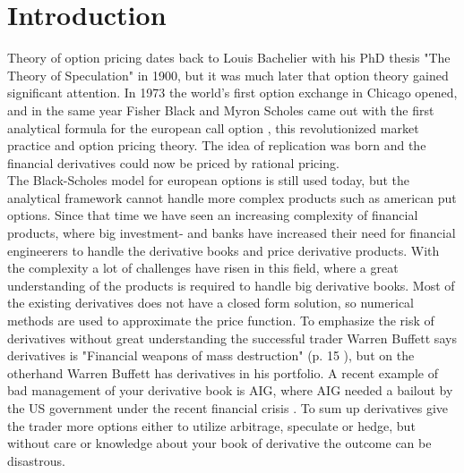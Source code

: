 
\chapter{Introduction} %

\label{Chapter1} %

Theory of option pricing dates back to Louis Bachelier with his PhD thesis "The Theory of Speculation" in 1900, but it was much later that option theory gained significant attention. In 1973 the world's first option exchange in Chicago opened, and in the same year Fisher Black and Myron Scholes came out with the first analytical formula for the european call option \parencite{B-S-Paper}, this revolutionized market practice and option pricing theory. The idea of replication was born and the financial derivatives could now be priced by rational pricing. \\

The Black-Scholes model for european options is still used today, but the analytical framework cannot handle more complex products such as american put options. Since that time we have seen an increasing complexity of financial products, where big investment- and banks have increased their need for financial engineerers to handle the derivative books and price derivative products. With the complexity a lot of challenges have risen in this field, where a great understanding of the products is required to handle big derivative books. Most of the existing derivatives does not have a closed form solution, so numerical methods are used to approximate the price function. To emphasize the risk of derivatives without great understanding the successful trader Warren Buffett says derivatives is "Financial weapons of mass destruction" (p. 15 \parencite{Buffett02}), but on the otherhand Warren Buffett has derivatives in his portfolio. A recent example of bad management of your derivative book is AIG, where AIG needed a bailout by the US government under the recent financial crisis \parencite{McDonaldRobert2015}. To sum up derivatives give the trader more options either to utilize arbitrage, speculate or hedge, but without care or knowledge about your book of derivative the outcome can be disastrous.\\

